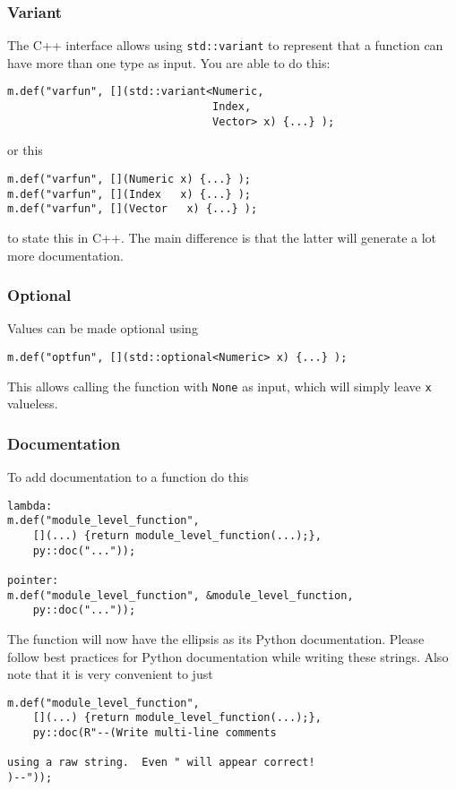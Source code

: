 \subsubsection{Variant}
The C++ interface allows using \verb|std::variant| to represent that a function can have more than one type as input.
You are able to do this:
\begin{verbatim}
m.def("varfun", [](std::variant<Numeric,
                                Index,
                                Vector> x) {...} );
\end{verbatim}
or this
\begin{verbatim}
m.def("varfun", [](Numeric x) {...} );
m.def("varfun", [](Index   x) {...} );
m.def("varfun", [](Vector   x) {...} );
\end{verbatim}
to state this in C++.  The main difference is that the latter will generate a lot more documentation.
\subsubsection{Optional}
Values can be made optional using
\begin{verbatim}
m.def("optfun", [](std::optional<Numeric> x) {...} );
\end{verbatim}
This allows calling the function with \verb|None| as input, which will simply leave \verb|x| valueless.
\subsubsection{Documentation}
To add documentation to a function do this
\begin{verbatim}
lambda:
m.def("module_level_function",
    [](...) {return module_level_function(...);},
    py::doc("..."));

pointer:
m.def("module_level_function", &module_level_function,
    py::doc("..."));
\end{verbatim}
The function will now have the ellipsis as its Python documentation.  Please follow best practices for Python documentation while writing these strings.  Also
note that it is very convenient to just
\begin{verbatim}
m.def("module_level_function",
    [](...) {return module_level_function(...);},
    py::doc(R"--(Write multi-line comments

using a raw string.  Even " will appear correct!
)--"));
\end{verbatim}
